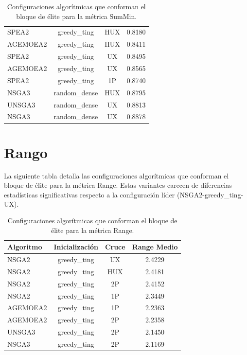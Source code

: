 \begin{table}[H]
\begin{tabular}{lccc}
        SPEA2 & greedy\_ting & HUX & 0.8180 \\
        AGEMOEA2 & greedy\_ting & HUX & 0.8411 \\
        SPEA2 & greedy\_ting & UX & 0.8495 \\
        AGEMOEA2 & greedy\_ting & UX & 0.8565 \\
        SPEA2 & greedy\_ting & 1P & 0.8740 \\
        NSGA3 & random\_dense & HUX & 0.8795 \\
        UNSGA3 & random\_dense & UX & 0.8813 \\
        NSGA3 & random\_dense & UX & 0.8878 \\
        \bottomrule
    \end{tabular}
    \caption[Bloque de élite de SumMin]{Configuraciones algorítmicas que conforman el bloque de élite para la métrica SumMin.}
    \label{tab:elite_summin}
\end{table}

\section{Rango}\label{anexo:elite_range}

La siguiente tabla detalla las configuraciones algorítmicas que conforman el bloque de élite para la métrica Range. Estas variantes carecen de diferencias estadísticas significativas respecto a la configuración líder (NSGA2-greedy\_ting-UX).

\begin{table}[H]
    \centering
    \begin{tabular}{lccc}
        \toprule
        \textbf{Algoritmo} & \textbf{Inicialización} & \textbf{Cruce} & \textbf{Range Medio} \\
        \midrule
        NSGA2 & greedy\_ting & UX & 2.4229 \\
        NSGA2 & greedy\_ting & HUX & 2.4181 \\
        NSGA2 & greedy\_ting & 2P & 2.4152 \\
        NSGA2 & greedy\_ting & 1P & 2.3449 \\
        AGEMOEA2 & greedy\_ting & 1P & 2.2363 \\
        AGEMOEA2 & greedy\_ting & 2P & 2.2358 \\
        UNSGA3 & greedy\_ting & 2P & 2.1450 \\
        NSGA3 & greedy\_ting & 2P & 2.1169 \\
        \bottomrule
    \end{tabular}
    \caption[Bloque de élite de Range]{Configuraciones algorítmicas que conforman el bloque de élite para la métrica Range.}
    \label{tab:range_ranking}
\end{table}


